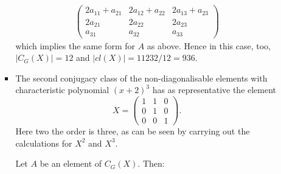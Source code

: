 \documentclass[11pt]{article} \usepackage{amssymb}
\begin{document}
\begin{enumerate}
\begin{enumerate}
\begin{itemize}
\begin{eqnarray*}
\begin{pmatrix}
            2a_{11}+a_{21}&2a_{12}+a_{22}  &2a_{13}+a_{23} \\ 
            2a_{21}&2a_{22}  &2a_{23} \\ 
            a_{31}&a_{32}  &a_{33} 
          \end{pmatrix}
        \end{eqnarray*}
        which implies the same form for $A$ as above. Hence in this case, too,
        $|C_G(X)|=12$ and $|cl(X)|=11232/12=936$.
      \item
        The second conjugacy class of the non-diagonalisable elements with 
        characteristic polynomial
        $(x+2)^3$ has as representative the element
        \begin{equation*}
          X=
          \begin{pmatrix}
            1&1  &0 \\ 
            0&1  &0 \\ 
            0&0  &1 
          \end{pmatrix}.
        \end{equation*}
        Here two the order is three, as can be seen by carrying out the 
        calculations for $X^2$ and $X^3$.

        Let $A$ be an element of $C_G(X)$. Then:
        

\end{itemize}
\end{enumerate}
\end{enumerate}
\end{document}
